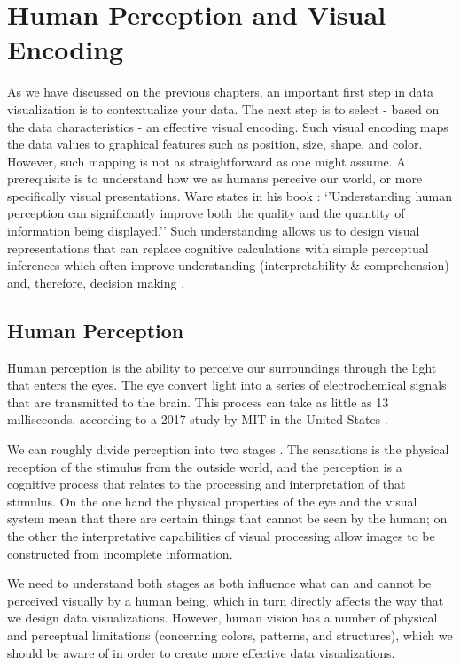 \documentclass[
]{book}
\begin{document}
\hypertarget{human-perception-and-visual-encoding}{%
\chapter{Human Perception and Visual Encoding}\label{human-perception-and-visual-encoding}}

As we have discussed on the previous chapters, an important first step in data visualization is to contextualize your data. The next step is to select - based on the data characteristics - an effective visual encoding. Such visual encoding maps the data values to graphical features such as position, size, shape, and color. However, such mapping is not as straightforward as one might assume. A prerequisite is to understand how we as humans perceive our world, or more specifically visual presentations. Ware states in his book \citep{ware2019information}: `'Understanding human perception can significantly improve both the quality and the quantity of information being displayed.'' Such understanding allows us to design visual representations that can replace cognitive calculations with simple perceptual inferences which often improve understanding (interpretability \& comprehension) and, therefore, decision making \citep{Heer_Bostock_Ogievetsky_2010}.

\hypertarget{human-perception}{%
\section{Human Perception}\label{human-perception}}

Human perception is the ability to perceive our surroundings through the light that enters the eyes. The eye convert light into a series of electrochemical signals that are transmitted to the brain. This process can take as little as 13 milliseconds, according to a 2017 study by MIT in the United States \citep{munzner2014visualization}.

We can roughly divide perception into two stages \citep{Few2004showmenumbers}. The sensations is the physical reception of the stimulus from the outside world, and the perception is a cognitive process that relates to the processing and interpretation of that stimulus. On the one hand the physical properties of the eye and the visual system mean that there are certain things that cannot be seen by the human; on the other the interpretative capabilities of visual processing allow images to be constructed from incomplete information.

We need to understand both stages as both influence what can and cannot be perceived visually by a human being, which in turn directly affects the way that we design data visualizations. However, human vision has a number of physical and perceptual limitations (concerning colors, patterns, and structures), which we should be aware of in order to create more effective data visualizations.
\end{document}
